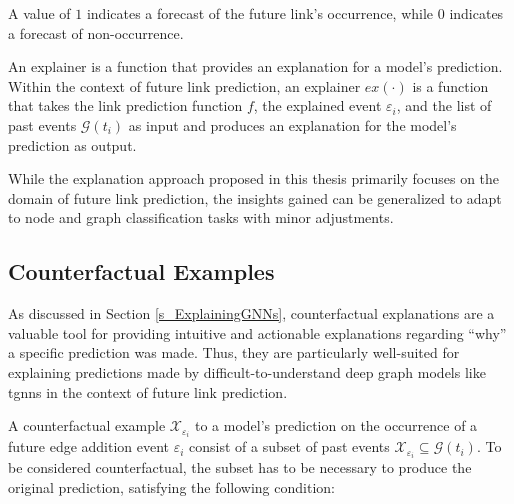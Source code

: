 A value of $1$ indicates a forecast of the future link’s occurrence, while $0$ indicates a forecast of non-occurrence.

An explainer is a function that provides an explanation for a model’s prediction. Within the context of future link prediction, an explainer $ex(\cdot)$ is a function that takes the link prediction function $f$, the explained event $\varepsilon_{i}$, and the list of past events $\mathcal{G}(t_i)$ as input and produces an explanation for the model's prediction as output.

While the explanation approach proposed in this thesis primarily focuses on the domain of future link prediction, the insights gained can be generalized to adapt to node and graph classification tasks with minor adjustments.

\subsection{Counterfactual Examples}
\label{s_ProblemFormulation_CFExamples}

As discussed in Section \ref{s_ExplainingGNNs}, counterfactual explanations are a valuable tool for providing intuitive and actionable explanations regarding “why” a specific prediction was made. Thus, they are particularly well-suited for explaining predictions made by difficult-to-understand deep graph models like \glspl{tgnn} in the context of future link prediction.


A counterfactual example $\mathcal{X}_{\varepsilon_i}$ to a model's prediction on the occurrence of a future edge addition event $\varepsilon_{i}$ consist of a subset of past events $\mathcal{X}_{\varepsilon_i} \subseteq \mathcal{G}(t_i)$. To be considered counterfactual, the subset has to be necessary to produce the original prediction, satisfying the following condition:

